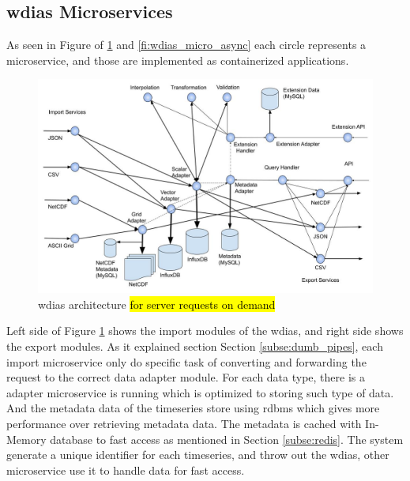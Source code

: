 \subsection{\acrshort{wdias} Microservices}
\label{sebse:wdias_microservices}
As seen in Figure of \ref{fi:wdias_micro_on_demand} and \ref{fi:wdias_micro_async} each circle represents a microservice, and those are implemented as containerized applications.
\begin{figure}[htp]
    \centering
    \includegraphics[width=1\textwidth]{method/microservice/microservice_architecture-handle_on_demand-v3.jpg}
    \caption{\acrshort{wdias} architecture \hl{for server requests on demand}}
    \label{fi:wdias_micro_on_demand}
\end{figure}
Left side of Figure \ref{fi:wdias_micro_on_demand} shows the import modules of the \acrshort{wdias}, and right side shows the export modules. As it explained section Section \ref{subse:dumb_pipes}, each import microservice only do specific task of converting and forwarding the request to the correct data adapter module.
For each data type, there is a adapter microservice is running which is optimized to storing such type of data. And the metadata data of the timeseries store using \acrshort{rdbms} which gives more performance over retrieving metadata data. The metadata is cached with In-Memory database to fast access as mentioned in Section \ref{subse:redis}.
The system generate a unique identifier for each timeseries, and throw out the \acrshort{wdias}, other microservice use it to handle data for fast access.

